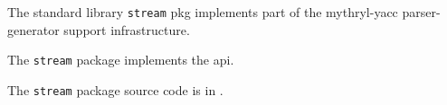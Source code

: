 

The standard library {\tt stream} pkg implements part of the mythryl-yacc parser-generator support infrastructure.

The {\tt stream} package implements the  api.

The {\tt stream} package source code is in .










